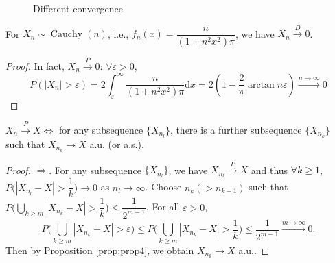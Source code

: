 \documentclass[11pt,singlecolumn, openany, citestyle=authoryear]{elegantbook}
\begin{document}
\begin{CJK}{UTF8}{gbsn}
\begin{figure}[htbp]
    \centering
\caption{Different convergence}
\label{figure:fig2}
\end{figure}

\begin{example}
    For $X_n \sim \operatorname{Cauchy}(n)$, i.e., $f_n(x)=\dfrac{n}{(1+n^2x^2)\pi}$, 
    we have $X_n \overset{D}{\longrightarrow} 0$.
\end{example}
\begin{proof}
    In fact, $X_n \overset{P}{\longrightarrow} 0$: $\forall \varepsilon>0$, 
    $$
    P(|X_n|>\varepsilon)=2\int_\varepsilon^\infty \frac{n}{(1+n^2x^2)\pi} \mathrm{d}x
    =2 \left(
        1-\frac{2}{\pi}\arctan n\varepsilon
    \right)
    \overset{n\to\infty}{\longrightarrow}0
    $$
\end{proof}

\begin{proposition}
    $X_n \overset{P}{\longrightarrow}X \iff$ for any subsequence $\{X_{n_l}\}$, there 
    is a further subsequence $\{X_{n_k}\}$ such that 
    $X_{n_k} \longrightarrow X$ a.u. (or a.s.).
\end{proposition}
\begin{proof}
    $\Longrightarrow$. For any subsequence $\{X_{n_l}\}$, we have
    $X_{n_l} \overset{P}{\longrightarrow}X$ and thus 
    $\forall k \geqslant 1$, $P\bigg(
        |X_{n_l}-X|>\dfrac{1}{k}
    \bigg)\to 0$ as $n_l \to \infty$. Choose $n_k(>n_{k-1})$ such that 
    $P\bigg(\displaystyle \bigcup_{k\geqslant m}
        |X_{n_k}-X|>\dfrac{1}{k}
    \bigg)\leqslant \dfrac{1}{2^{m-1}}$. For all $\varepsilon>0$,
    $$
    P\bigg(\displaystyle \bigcup_{k\geqslant m}
        |X_{n_k}-X|>\varepsilon
    \bigg)\leqslant 
    P\bigg(\displaystyle \bigcup_{k\geqslant m}
        |X_{n_k}-X|>\dfrac{1}{k}
    \bigg)\leqslant \frac{1}{2^{m-1}}
    \overset{m\to\infty}{\longrightarrow}0.
    $$
    Then by Proposition \ref{prop:prop4}, we obtain $X_{n_k}\to X$ a.u..


\end{proof}
\end{CJK}
\end{document}
